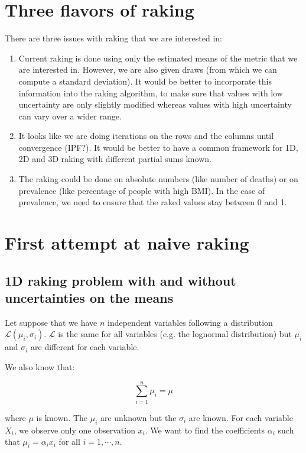 \section{Three flavors of raking}

There are three issues with raking that we are interested in:

\begin{enumerate}
    \item Current raking is done using only the estimated means of the metric that we are interested in. However, we are also given draws (from which we can compute a standard deviation). It would be better to incorporate this information into the raking algorithm, to make sure that values with low uncertainty are only slightly modified whereas values with high uncertainty can vary over a wider range.
    \item It looks like we are doing iterations on the rows and the columns until convergence (IPF?). It would be better to have a common framework for 1D, 2D and 3D raking with different partial sums known.
    \item The raking could be done on absolute numbers (like number of deaths) or on prevalence (like percentage of people with high BMI). In the case of prevalence, we need to ensure that the raked values stay between 0 and 1.
\end{enumerate}

\section{First attempt at naive raking}

\subsection{1D raking problem with and without uncertainties on the means}

Let suppose that we have $n$ independent variables following a distribution $\mathcal{L} \left(\mu_i , \sigma_i \right)$. $\mathcal{L}$ is the same for all variables (e.g. the lognormal distribution) but $\mu_i$ and $\sigma_i$ are different for each variable.

We also know that:

\begin{equation*}
\sum_{i = 1}^n \mu_i = \mu
\end{equation*}

where $\mu$ is known. The $\mu_i$ are unknown but the $\sigma_i$ are known. For each variable $X_i$, we observe only one observation $x_i$. We want to find the coefficients $\alpha_i$ such that $\mu_i = \alpha_i x_i$ for all $i = 1 , \cdots , n$.

